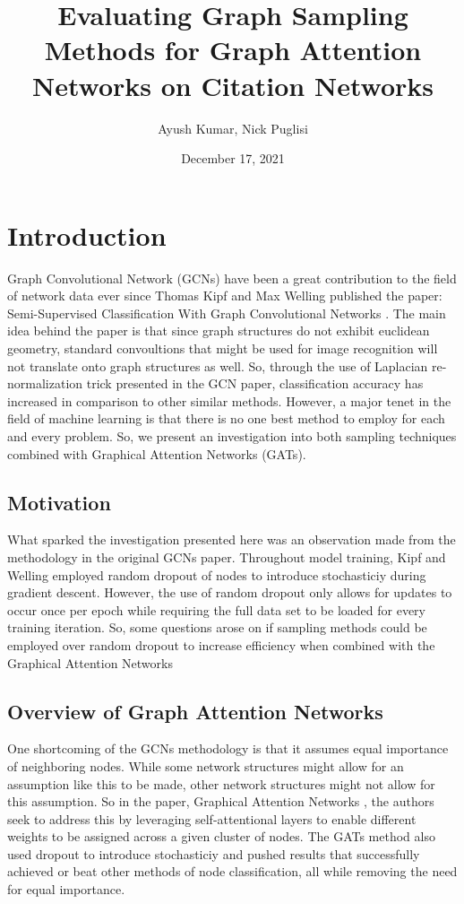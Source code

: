 \documentclass{article}
\title{Evaluating Graph Sampling Methods for Graph Attention Networks on Citation Networks}
\author{Ayush Kumar, Nick Puglisi}
\date{December 17, 2021}
\begin{document}
	\maketitle
	\tableofcontents
	\pagebreak
	\section{Introduction}
	
	Graph Convolutional Network (GCNs) have been a great contribution to the field of network data ever since Thomas Kipf and Max Welling published the paper: Semi-Supervised Classification With Graph Convolutional Networks \cite{kipf2017semisupervised}. The main idea behind the paper is that since graph structures do not exhibit euclidean geometry, standard convoultions that might be used for image recognition will not translate onto graph structures as well. So, through the use of Laplacian re-normalization trick presented in the GCN paper, classification accuracy	has increased in comparison to other similar methods. However, a major tenet in the field of machine learning is that there is no one best method to employ for each and every problem. So, we present an investigation into both sampling techniques combined with Graphical Attention Networks (GATs).

	\subsection{Motivation}
	
	What sparked the investigation presented here was an observation made from the methodology  in the original GCNs paper. 
	Throughout model training, Kipf and Welling employed random dropout of nodes to introduce stochasticiy during gradient descent. However, the use of random dropout only allows
	for updates to occur once per epoch while requiring the full data set to be loaded for every training iteration. So, some questions arose on if 
	sampling methods could be employed over random dropout to increase efficiency when combined with the Graphical Attention Networks
	
	\subsection{Overview of Graph Attention Networks}
	
	One shortcoming of the GCNs methodology is that it assumes equal importance of neighboring nodes. While some network structures might allow for
	an assumption like this to be made, other network structures might not allow for this assumption. So in the paper, 
	Graphical Attention Networks \cite{velockovic2018graph}, the authors seek to address this by leveraging self-attentional layers to enable different weights to be assigned across a given cluster of nodes. 
	The GATs method also used dropout to introduce stochasticiy and pushed results that successfully achieved or beat other methods of node classification, all while 
	removing the need for equal importance.
\end{document}
